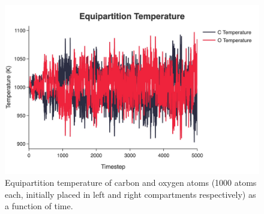 \documentclass[10pt]{article}
\begin{document}
\begin{figure}[H]
\begin{minipage}{0.43\linewidth}
    \end{minipage}
    \begin{minipage}{0.43\linewidth}
        \includegraphics[width=\linewidth]{../figures/jpg/temperature/atoms_1000_temp_1000_equipartition_temperature.jpg}
    \end{minipage}
    \caption{Equipartition temperature of carbon and oxygen atoms (1000 atoms each, initially placed in left and right compartments respectively) as a function of time.}
    \label{fig:temperature_evolution}
\end{figure}

\newpage
\end{document}
